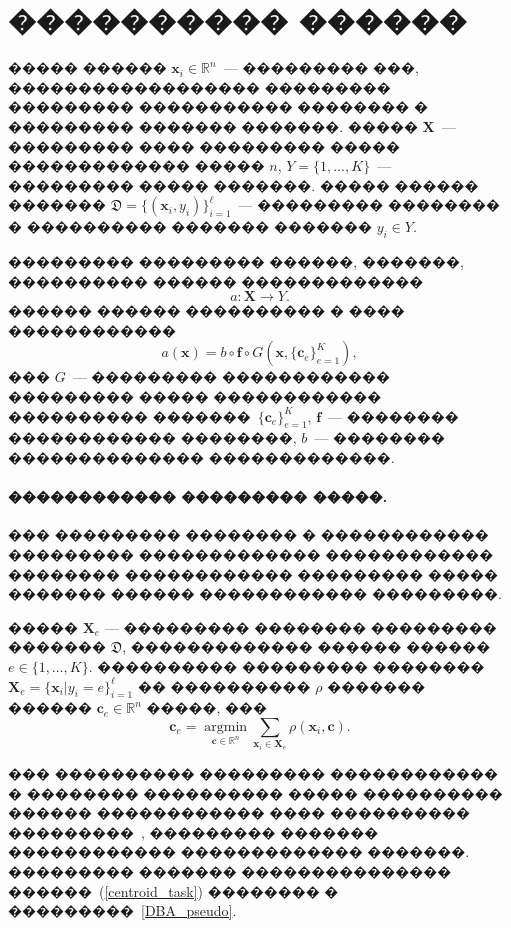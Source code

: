 \documentclass[12pt,twoside, notitlepage]{article}
\begin{document}
\section{���������� ������}
����� ������ $\mathbf{x}_i \in \mathbb{R}^n$~--- ��������� ���, ������������������ ��������� ��������� ����������� �������� � ��������� ������� �������.
����� $\mathbf{X}$~--- ��������� ���� ��������� ����� ������������� ����� $n$, $Y = \{1, \dots, K\}$~--- ��������� ����� �������.
����� ������ ������� $\mathfrak{D} = \{(\mathbf{x}_i, y_i)\}_{i=1}^\ell$~--- ��������� �������� � ���������� ������� ������� $y_i \in Y$.

��������� ��������� ������, �������, ���������� ������ �������������
\[
    a: \mathbf{X} \to Y.
\]
������ ������ ���������� � ���� ������������
\begin{equation}
\label{eq:classifiers}
a(\mathbf{x}) = b \circ \mathbf{f} \circ G(\mathbf{x}, \{\mathbf{c}_e\}_{e = 1} ^ K),
\end{equation}
 ��� $G$~--- ��������� ������������ ��������� ����� ������������ ���������� �������~$\{\mathbf{c}_e\}_{e = 1} ^ K$, $\mathbf{f}$~--- �������� ������������ ��������, $b$~--- �������� �������������� �������������.

\paragraph{������������ ��������� �����.}

��� ��������� �������� � ������������ ��������� ������������� ������������ �������� ������������ ��������� ����� ������� ������ ������������ ���������.

����� $\mathbf{X}_e$ --- ��������� �������� ��������� ������� $\mathfrak{D}$, ������������� ������ ������ $e \in \{1, \dots, K\}$.
���������� ��������� �������� $\mathbf{X}_e = \{\mathbf{x}_i|y_i=e\}_{i=1}^\ell$ �� ���������� $\rho$ ������� ������ $\mathbf{c}_e \in \mathbb{R}^n$ �����, ���
\begin{equation}
\label{centroid_task}
    \mathbf{c}_e = \mathop{\text{argmin}}\limits_{{\mathbf{c} \in \mathbb{R}^n}}\sum_{\mathbf{x}_i \in \mathbf{X}_e}
    {\rho(\mathbf{x}_i ,\mathbf{c})}.
\end{equation}

��� ���������� ��������� ������������ � �������� ���������� ����� ���������� ������ ������������ ���� ���������� ���������~\cite{goncharov2015cost}, ��������� ������� ������������ ������������� �������.
��������� ������� ��������������� ������~(\ref{centroid_task}) �������� � ���������~\ref{DBA_pseudo}.
\end{document}
